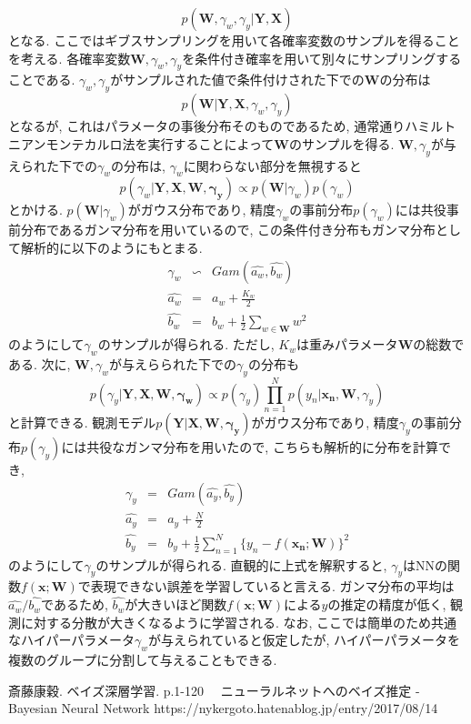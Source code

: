 \documentclass[twocolumn]{jarticle}
\begin{document}
\begin{equation}
  p(\bm {W}, \gamma_w, \gamma_y | \bm {Y, X})
\end{equation}
となる. ここではギブスサンプリングを用いて各確率変数のサンプルを得ることを考える. 各確率変数${\bm {W}, \gamma_w, \gamma_y}$を条件付き確率を用いて別々にサンプリングすることである. ${\gamma_w, \gamma_y}$がサンプルされた値で条件付けされた下での${\bm {W}}$の分布は
\begin{equation}
  p(\bm {W|Y, X}, \gamma_w, \gamma_y)
\end{equation}
となるが, これはパラメータの事後分布そのものであるため, 通常通りハミルトニアンモンテカルロ法を実行することによって${\bm {W}}$のサンプルを得る. ${\bm {W}, \gamma_y}$が与えられた下での${\gamma_w}$の分布は, ${\gamma_w}$に関わらない部分を無視すると
\begin{equation}
  p(\gamma_w| \bm {Y, X, W, \gamma_y}) \varpropto p(\bm {W}|\gamma_w)p(\gamma_w)
\end{equation}
とかける. ${p(\bm {W}|\gamma_w)}$がガウス分布であり, 精度${\gamma_w}$の事前分布${p(\gamma_w)}$には共役事前分布であるガンマ分布を用いているので, この条件付き分布もガンマ分布として解析的に以下のようにもとまる.
\begin{eqnarray}
  \gamma_w &\backsim & Gam (\hat{a_w}, \hat{b_w}) \\
  \hat{a_w} &=& a_w + \frac{K_w}{2} \\
  \hat{b_w} &=& b_w + \frac{1}{2} \sum_{w \in \bm {W}} w^2
\end{eqnarray}
のようにして${\gamma_w}$のサンプルが得られる. ただし, ${K_w}$は重みパラメータ${\bm {W}}$の総数である. 次に, ${\bm {W}, \gamma_w}$が与えらられた下での${\gamma_y}$の分布も
\begin{equation}
  p(\gamma_y|\bm {Y, X, W, \gamma_w}) \varpropto p(\gamma_y) \prod_{n=1}^{N} p(y_n|\bm {x_n, W}, \gamma_y)
\end{equation}
と計算できる. 観測モデル${p(\bm {Y|X, W, \gamma_y})}$がガウス分布であり, 精度${\gamma_y}$の事前分布${p(\gamma_y)}$には共役なガンマ分布を用いたので, こちらも解析的に分布を計算でき,
\begin{eqnarray}
  \gamma_y &=& Gam (\hat{a_y}, \hat{b_y}) \\
  \hat {a_y} &=& a_y + \frac{N}{2} \\
  \hat {b_y} &=& b_y + \frac{1}{2} \sum_{n=1}^{N} \{y_n - f(\bm {x_n;W})\}^2
\end{eqnarray}
のようにして${\gamma_y}$のサンプルが得られる. 直観的に上式を解釈すると, ${\gamma_y}$はNNの関数${f(\bm {x;W})}$で表現できない誤差を学習していると言える. ガンマ分布の平均は${\hat {a_w} / \hat {b_w}}$であるため, ${\hat {b_w}}$が大きいほど関数${f(\bm {x;W})}$による${y}$の推定の精度が低く, 観測に対する分散が大きくなるように学習される. なお, ここでは簡単のため共通なハイパーパラメータ${\gamma_w}$が与えられていると仮定したが, ハイパーパラメータを複数のグループに分割して与えることもできる.



\begin{thebibliography}{9}
   斎藤康穀. ベイズ深層学習. p.1-120
  　ニューラルネットへのベイズ推定 - Bayesian Neural Network https://nykergoto.hatenablog.jp/entry/2017/08/14
\end{thebibliography}
\end{document}
